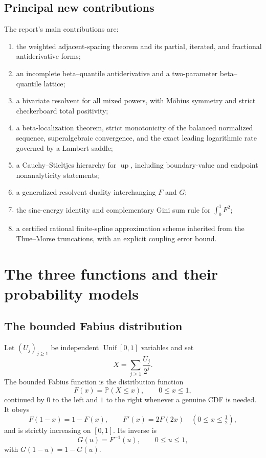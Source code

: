 \documentclass[11pt,oneside]{article}
\theoremstyle{definition}
\theoremstyle{remark}
\newcommand{\F}{F}
\newcommand{\G}{G}
\newcommand{\Up}{\operatorname{up}}
\newcommand{\Pp}{\mathbb P}
\begin{document}
\subsection{Principal new contributions}

The report's main contributions are:
\begin{enumerate}
  \item the weighted adjacent-spacing theorem and its partial, iterated, and
        fractional antiderivative forms;
  \item an incomplete beta--quantile antiderivative and a two-parameter
        beta--quantile lattice;
  \item a bivariate resolvent for all mixed powers, with Möbius symmetry and
        strict checkerboard total positivity;
  \item a beta-localization theorem, strict monotonicity of the balanced
        normalized sequence, superalgebraic convergence, and the exact leading
        logarithmic rate governed by a Lambert saddle;
  \item a Cauchy--Stieltjes hierarchy for \(\Up\), including boundary-value and
        endpoint nonanalyticity statements;
  \item a generalized resolvent duality interchanging \(\F\) and \(\G\);
  \item the sinc-energy identity and complementary Gini sum rule for
        \(\int_0^1\F^2\);
  \item a certified rational finite-spline approximation scheme inherited from
        the Thue--Morse truncations, with an explicit coupling error bound.
\end{enumerate}

\section{The three functions and their probability models}

\subsection{The bounded Fabius distribution}

Let \((U_j)_{j\ge1}\) be independent \(\operatorname{Unif}[0,1]\) variables and
set
\begin{equation}\label{eq:Xdef}
  X=\sum_{j\ge1}\frac{U_j}{2^j}.
\end{equation}
The bounded Fabius function is the distribution function
\begin{equation}
  \F(x)=\Pp(X\le x),\qquad 0\le x\le1,
\end{equation}
continued by \(0\) to the left and \(1\) to the right whenever a genuine CDF is
needed.  It obeys
\begin{equation}\label{eq:Fbasic}
 \F(1-x)=1-\F(x),\qquad
 \F'(x)=2\F(2x)\quad(0\le x\le\tfrac12),
\end{equation}
and is strictly increasing on \([0,1]\).  Its inverse is
\begin{equation}
  \G(u)=\F^{-1}(u),\qquad 0\le u\le1,
\end{equation}
with \(\G(1-u)=1-\G(u)\).
\end{document}
